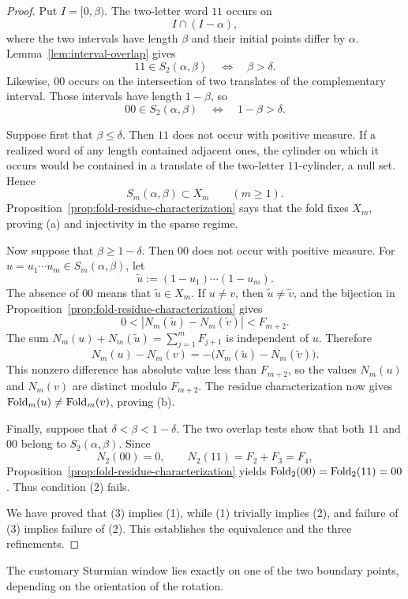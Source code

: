 \begin{proof}
Put \(I=[0,\beta)\).  The two-letter word \(11\) occurs on
\[
I\cap(I-\alpha),
\]
where the two intervals have length \(\beta\) and their initial points
differ by \(\alpha\).  Lemma~\ref{lem:interval-overlap} gives
\[
11\in S_2(\alpha,\beta)
\quad\Longleftrightarrow\quad
\beta>\delta.
\]
Likewise, \(00\) occurs on the intersection of two translates of the
complementary interval.  Those intervals have length \(1-\beta\), so
\[
00\in S_2(\alpha,\beta)
\quad\Longleftrightarrow\quad
1-\beta>\delta.
\]

Suppose first that \(\beta\leq\delta\).  Then \(11\) does not occur with
positive measure.  If a realized word of any length contained adjacent
ones, the cylinder on which it occurs would be contained in a translate of
the two-letter \(11\)-cylinder, a null set.  Hence
\[
S_m(\alpha,\beta)\subset X_m
\qquad(m\geq1).
\]
Proposition~\ref{prop:fold-residue-characterization} says that the fold
fixes \(X_m\), proving (a) and injectivity in the sparse regime.

Now suppose that \(\beta\geq1-\delta\).  Then \(00\) does not occur with
positive measure.  For \(u=u_1\cdots u_m\in S_m(\alpha,\beta)\), let
\[
\widetilde u:=(1-u_1)\cdots(1-u_m).
\]
The absence of \(00\) means that \(\widetilde u\in X_m\).  If \(u\neq v\),
then \(\widetilde u\neq\widetilde v\), and the bijection in
Proposition~\ref{prop:fold-residue-characterization} gives
\[
0<
\left|N_m(\widetilde u)-N_m(\widetilde v)\right|
<F_{m+2}.
\]
The sum \(N_m(u)+N_m(\widetilde u)=\sum_{j=1}^mF_{j+1}\) is independent of
\(u\).  Therefore
\[
N_m(u)-N_m(v)
=-\bigl(N_m(\widetilde u)-N_m(\widetilde v)\bigr).
\]
This nonzero difference has absolute value less than \(F_{m+2}\), so the
values \(N_m(u)\) and \(N_m(v)\) are distinct modulo \(F_{m+2}\).
The residue characterization now gives
\(\operatorname{Fold}_m(u)\neq\operatorname{Fold}_m(v)\), proving (b).

Finally, suppose that \(\delta<\beta<1-\delta\).  The two overlap tests show
that both \(11\) and \(00\) belong to \(S_2(\alpha,\beta)\).  Since
\[
N_2(00)=0,\qquad
N_2(11)=F_2+F_3=F_4,
\]
Proposition~\ref{prop:fold-residue-characterization} yields
\(\operatorname{Fold}_2(00)=\operatorname{Fold}_2(11)=00\).  Thus condition (2) fails.

We have proved that (3) implies (1), while (1) trivially implies (2), and
failure of (3) implies failure of (2).  This establishes the equivalence and
the three refinements.
\end{proof}

The customary Sturmian window lies exactly on one of the two boundary
points, depending on the orientation of the rotation.

